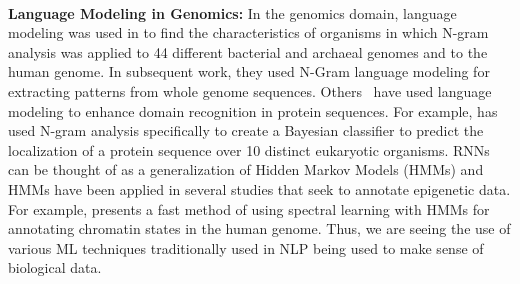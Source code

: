 \\
\textbf{Language Modeling in Genomics:} In the genomics domain, language modeling was used in \cite{ganapathiraju2002comparative} to find the characteristics of organisms in which N-gram analysis was applied to 44 different bacterial and archaeal genomes and to the human genome. 
In subsequent work, they used N-Gram language modeling for extracting patterns from whole genome sequences. Others~\cite{coin2003enhanced} have used language modeling to enhance domain recognition in protein sequences. For example, \cite{king2007ngloc} has used N-gram analysis specifically to create a Bayesian classifier to predict the localization of a protein sequence over 10 distinct eukaryotic organisms. 
RNNs can be thought of as a generalization of Hidden Markov Models (HMMs) and HMMs have been applied in several studies that seek to annotate epigenetic data. For example, \cite{song2015spectacle} presents a fast method of using spectral learning with HMMs for annotating chromatin states in the human genome.
Thus, we are seeing the use of various ML techniques traditionally used in NLP being used to make sense of biological data.  
\vspace{-5pt}